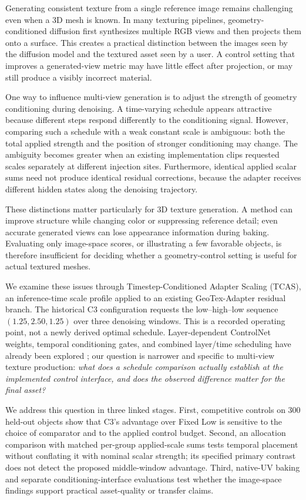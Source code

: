 \documentclass[times,twocolumn,final]{elsarticle}
\begin{document}
Generating consistent texture from a single reference image remains challenging even when a 3D mesh is known. In many texturing pipelines, geometry-conditioned diffusion first synthesizes multiple RGB views and then projects them onto a surface. This creates a practical distinction between the images seen by the diffusion model and the textured asset seen by a user. A control setting that improves a generated-view metric may have little effect after projection, or may still produce a visibly incorrect material.

One way to influence multi-view generation is to adjust the strength of geometry conditioning during denoising. A time-varying schedule appears attractive because different steps respond differently to the conditioning signal. However, comparing such a schedule with a weak constant scale is ambiguous: both the total applied strength and the position of stronger conditioning may change. The ambiguity becomes greater when an existing implementation clips requested scales separately at different injection sites. Furthermore, identical applied scalar sums need not produce identical residual corrections, because the adapter receives different hidden states along the denoising trajectory.

These distinctions matter particularly for 3D texture generation. A method can improve structure while changing color or suppressing reference detail; even accurate generated views can lose appearance information during baking. Evaluating only image-space scores, or illustrating a few favorable objects, is therefore insufficient for deciding whether a geometry-control setting is useful for actual textured meshes.

We examine these issues through Timestep-Conditioned Adapter Scaling (TCAS), an inference-time scale profile applied to an existing GeoTex-Adapter residual branch. The historical C3 configuration requests the low--high--low sequence $(1.25,2.50,1.25)$ over three denoising windows. This is a recorded operating point, not a newly derived optimal schedule. Layer-dependent ControlNet weights, temporal conditioning gates, and combined layer/time scheduling have already been explored \cite{zhang2023controlnet,controlnet2023layercontrol,diffusers2023controlnet,kulkarni2026ssi}; our question is narrower and specific to multi-view texture production: \emph{what does a schedule comparison actually establish at the implemented control interface, and does the observed difference matter for the final asset?}

We address this question in three linked stages. First, competitive controls on 300 held-out objects show that C3's advantage over Fixed Low is sensitive to the choice of comparator and to the applied control budget. Second, an allocation comparison with matched per-group applied-scale sums tests temporal placement without conflating it with nominal scalar strength; its specified primary contrast does not detect the proposed middle-window advantage. Third, native-UV baking and separate conditioning-interface evaluations test whether the image-space findings support practical asset-quality or transfer claims.
\end{document}
